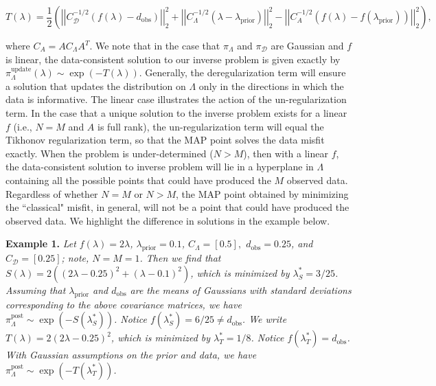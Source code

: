 \documentclass{amsart}
\begin{document}
\begin{equation} \label{eq:4}
T(\lambda)=\frac{1}{2}\left(\left|\left|C_\mathcal{D}^{-1/2}(f(\lambda)-d_{\text{obs}})\right|\right|_2^2+\left|\left|C_\Lambda^{-1/2}(\lambda-\lambda_{\text{prior}})\right|\right|_2^2-\left|\left|C_A^{-1/2}(f(\lambda)-f(\lambda_{\text{prior}}))\right|\right|_2^2\right),
\end{equation} 

\noindent where $C_A=AC_\Lambda A^T$. We note that in the case that $\pi_\Lambda$ and $\pi_\mathcal{D}$ are Gaussian and $f$ is linear, the data-consistent solution to our inverse problem is given exactly by $\pi_\Lambda^\text{update}(\lambda)\sim \exp(-T(\lambda))$. Generally, the deregularization term will ensure a solution that updates the distribution on $\Lambda$ only in the directions in which the data is informative. The linear case illustrates the action of the un-regularization term. In the case that a unique solution to the inverse problem exists for a linear $f$ (i.e., $N=M$ and $A$ is full rank), the un-regularization term will equal the Tikhonov regularization term, so that the MAP point solves the data misfit exactly. When the problem is under-determined ($N>M$), then with a linear $f$, the data-consistent solution to inverse problem will lie in a hyperplane in $\Lambda$ containing all the possible points that could have produced the $M$ observed data. Regardless of whether $N=M$ or $N>M$, the MAP point obtained by minimizing the ``classical" misfit, in general, will not be a point that could have produced the observed data. We highlight the difference in solutions in the example below.

\vspace{.125cm} 

\noindent \textbf{Example 1.} \textit{Let $f(\lambda)=2\lambda$, $\lambda_\text{prior}=0.1$, $C_\Lambda=[0.5],$ $d_\text{obs}=0.25$, and $C_\mathcal{D}=[0.25]$; note, $N=M=1$. Then we find that $S(\lambda)=2((2\lambda-0.25)^2+(\lambda-0.1)^2)$, which is minimized by $\lambda^*_S=3/25$. Assuming that $\lambda_\text{prior}$ and $d_\text{obs}$ are the means of Gaussians with standard deviations corresponding to the above covariance matrices, we have $\pi_\Lambda^\text{post} \sim \exp(-S(\lambda_S^*))$. Notice $f(\lambda^*_S)=6/25\neq d_\text{obs}$. We write $T(\lambda)=2(2\lambda-0.25)^2$, which is minimized by $\lambda^*_T=1/8$. Notice $f(\lambda^*_T)=d_\text{obs}$. With Gaussian assumptions on the prior and data, we have $\pi_\Lambda^\text{post} \sim \exp(-T(\lambda_T^*))$.}
\end{document}
